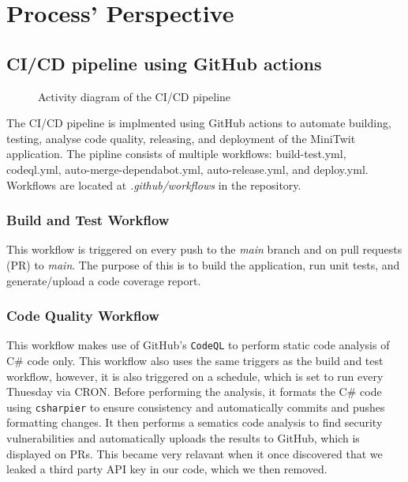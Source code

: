 \section{Process' Perspective}
\label{ch:background} 

\subsection{CI/CD pipeline using GitHub actions}
\begin{figure}
      \centering
      
      \caption{Activity diagram of the CI/CD pipeline}
      \label{fig:activity_diagram}
\end{figure}

The CI/CD pipeline is implmented using GitHub actions to automate 
building, testing, analyse code quality, releasing, and deployment
of the MiniTwit application.
The pipline consists of multiple workflows: build-test.yml, codeql.yml, auto-merge-dependabot.yml, auto-release.yml, and deploy.yml. 
Workflows are located at \textit{.github/workflows} in the repository. 
\subsubsection{Build and Test Workflow}
This workflow is triggered on every push to the \textit{main} branch and on pull requests (PR) to \textit{main}.
The purpose of this is to build the application, run unit tests, and generate/upload a code coverage report.
\subsubsection{Code Quality Workflow}
This workflow makes use of GitHub's \texttt{CodeQL} to perform static code analysis of C\# code only.
This workflow also uses the same triggers as the build and test workflow, however, it is also triggered on a schedule, 
which is set to run every Thuesday via CRON.
Before performing the analysis, it formats the C\# code using \texttt{csharpier} to 
ensure consistency and automatically commits and pushes formatting changes.
It then performs a sematics code analysis to find security vulnerabilities and automatically uploads the results to GitHub, 
which is displayed on PRs.
This became very relavant when it once discovered that we leaked a third party API key in our code, which we then removed.
